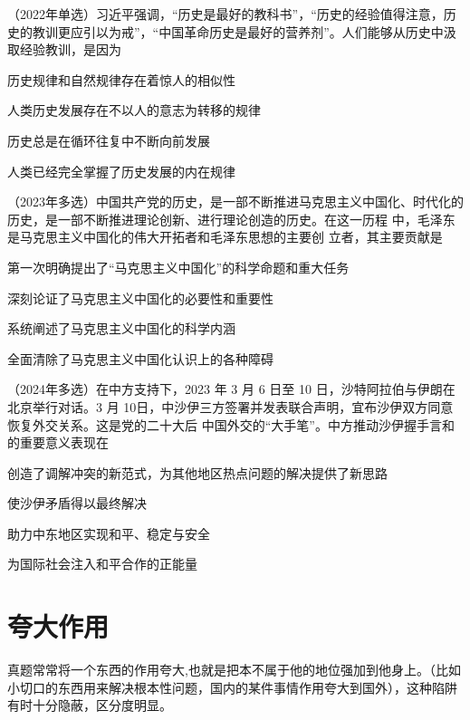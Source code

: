 \documentclass[lang=cn,blue,10pt,scheme=chinese,twocol]{zznote}
\begin{document}
\begin{example}
	（2022年单选）习近平强调，“历史是最好的教科书”，“历史的经验值得注意，历史的教训更应引以为戒”，“中国革命历史是最好的营养剂”。人们能够从历史中汲取经验教训，是因为
	\begin{choice}
		\item 历史规律和自然规律存在着惊人的相似性
		\item 人类历史发展存在不以人的意志为转移的规律
		\item 历史总是在循环往复中不断向前发展
		\item 人类已经完全掌握了历史发展的内在规律
	\end{choice}
\end{example}
\begin{example} （2023年多选）中国共产党的历史，是一部不断推进马克思主义中国化、时代化的 历史，是一部不断推进理论创新、进行理论创造的历史。在这一历程  中，毛泽东是马克思主义中国化的伟大开拓者和毛泽东思想的主要创
	立者，其主要贡献是
	\begin{choice}
		\item 第一次明确提出了“马克思主义中国化”的科学命题和重大任务
		\item 深刻论证了马克思主义中国化的必要性和重要性
		\item 系统阐述了马克思主义中国化的科学内涵
		\item 全面清除了马克思主义中国化认识上的各种障碍
	\end{choice}
\end{example}

\begin{example} （2024年多选）在中方支持下，2023 年 3 月 6 日至 10 日，沙特阿拉伯与伊朗在北京举行对话。3 月 10日，中沙伊三方签署并发表联合声明，宜布沙伊双方同意恢复外交关系。这是党的二十大后 中国外交的“大手笔”。中方推动沙伊握手言和的重要意义表现在
	\begin{choice}
		\item 创造了调解冲突的新范式，为其他地区热点问题的解决提供了新思路
		\item 使沙伊矛盾得以最终解决
		\item 助力中东地区实现和平、稳定与安全
		\item 为国际社会注入和平合作的正能量
	\end{choice}
\end{example}



\section{夸大作用}
\begin{definition}
	真题常常将一个东西的作用夸大,也就是把本不属于他的地位强加到他身上。（比如小切口的东西用来解决根本性问题，国内的某件事情作用夸大到国外），这种陷阱有时十分隐蔽，区分度明显。
\end{definition}
\end{document}
